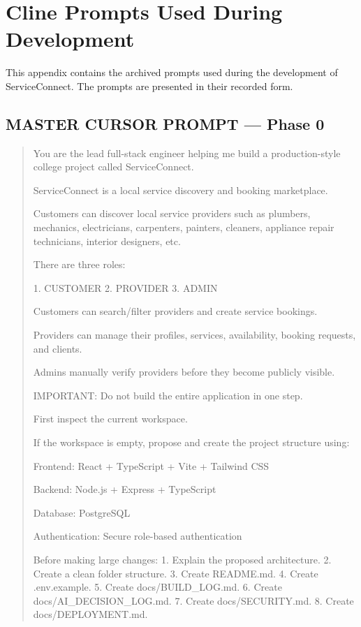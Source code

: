 \appendix
\section{Cline Prompts Used During Development}
\label{app:cline-prompts}

This appendix contains the archived prompts used during the development of
ServiceConnect. The prompts are presented in their recorded form.


\subsection*{MASTER CURSOR PROMPT --- Phase 0}

\begin{quote}
You are the lead full-stack engineer helping me build a production-style
college project called ServiceConnect.

ServiceConnect is a local service discovery and booking marketplace.

Customers can discover local service providers such as plumbers, mechanics,
electricians, carpenters, painters, cleaners, appliance repair technicians,
interior designers, etc.

There are three roles:

1. CUSTOMER
2. PROVIDER
3. ADMIN

Customers can search/filter providers and create service bookings.

Providers can manage their profiles, services, availability, booking requests,
and clients.

Admins manually verify providers before they become publicly visible.

IMPORTANT:
Do not build the entire application in one step.

First inspect the current workspace.

If the workspace is empty, propose and create the project structure using:

Frontend:
React + TypeScript + Vite + Tailwind CSS

Backend:
Node.js + Express + TypeScript

Database:
PostgreSQL

Authentication:
Secure role-based authentication

Before making large changes:
1. Explain the proposed architecture.
2. Create a clean folder structure.
3. Create README.md.
4. Create .env.example.
5. Create docs/BUILD_LOG.md.
6. Create docs/AI_DECISION_LOG.md.
7. Create docs/SECURITY.md.
8. Create docs/DEPLOYMENT.md.


\end{quote}
